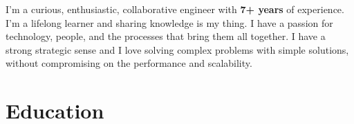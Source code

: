 \documentclass[10pt]{friggeri-cv} %
\begin{document}
I'm a curious, enthusiastic, collaborative engineer with \textbf{7+ years} of experience. I'm a lifelong learner and sharing knowledge is my thing. I have a passion for technology, people, and the processes that bring them all together. I have a strong strategic sense and I love solving complex problems with simple solutions, without compromising on the performance and scalability.


\section{Education}

\end{document}
